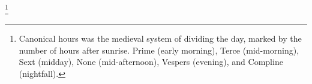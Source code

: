 \footnote{Canonical hours was the medieval system of dividing the day, marked by the number of hours after sunrise. Prime (early morning), Terce (mid-morning), Sext (midday), None (mid-afternoon), Vespers (evening), and Compline (nightfall).}